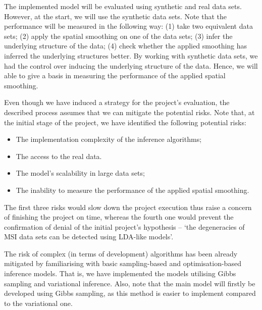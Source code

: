 \documentclass{mprop}
\begin{document}
% 
% 
\par The implemented model will be evaluated using synthetic and real data sets. However, at the start, we will use the synthetic data sets. Note that the performance will be measured in the following way: (1) take two equivalent data sets; (2) apply the spatial smoothing on one of the data sets; (3) infer the underlying structure of the data; (4) check whether the applied smoothing has inferred the underlying structures better. By working with synthetic data sets, we had the control over inducing the underlying structure of the data. Hence, we will able to give a basis in measuring the performance of the applied spatial smoothing. 

\par Even though we have induced a strategy for the project's evaluation, the described process assumes that we can mitigate the potential risks. Note that, at the initial stage of the project, we have identified the following potential risks:
\begin{itemize}
  \item The implementation complexity of the inference algorithms;
  \item The access to the real data.
  \item The model's scalability in large data sets;
  \item The inability to measure the performance of the applied spatial smoothing.
\end{itemize}
The first three risks would slow down the project execution thus raise a concern of finishing the project on time, whereas the fourth one would prevent the confirmation of denial of the initial project's hypothesis -- `the degeneracies of MSI data sets can be detected using LDA-like models'. 

\par The risk of complex (in terms of development) algorithms has been already mitigated by familiarising with basic sampling-based and optimisation-based inference models. That is, we have implemented the models utilising Gibbs sampling and variational inference. Also, note that the main model will firstly be developed using Gibbs sampling, as this method is easier to implement compared to the variational one.   
\end{document}
